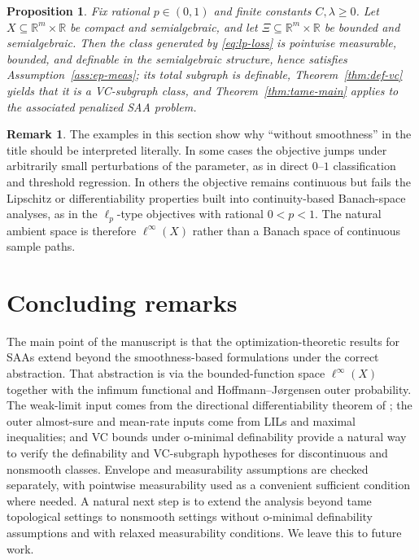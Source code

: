 \documentclass[11pt]{article}
\newtheorem{proposition}[theorem]{Proposition}\newtheorem{lemma}[theorem]{Lemma}\newtheorem{corollary}[theorem]{Corollary}\newtheorem{assumption}{Assumption}[section]\theoremstyle{definition}
\newtheorem{remark}[theorem]{Remark}
\begin{document}
\begin{proposition}\label{prop:lp} Fix rational $p\in(0,1)$ and finite
constants $C,\lambda\ge0$. Let $X\subseteq\mathbb{R}^{m}\times\mathbb{R}$
be compact and semialgebraic, and let $\Xi\subseteq\mathbb{R}^{m}\times\mathbb{R}$
be bounded and semialgebraic. Then the class generated by \eqref{eq:lp-loss} is
pointwise measurable, bounded, and definable in the semialgebraic
structure, hence satisfies Assumption~\ref{ass:ep-meas}; its total subgraph is definable,
Theorem~\ref{thm:def-vc} yields that it is a VC-subgraph class, and
Theorem~\ref{thm:tame-main} applies to the associated penalized SAA
problem.\end{proposition}

\begin{remark} The examples in this section show why ``without smoothness''
in the title should be interpreted literally. In some cases the objective
jumps under arbitrarily small perturbations of the parameter, as in
direct $0$--$1$ classification and threshold regression. In others
the objective remains continuous but fails the Lipschitz or differentiability
properties built into continuity-based Banach-space analyses, as in
the $\ell_{p}$-type objectives with rational $0<p<1$. The natural
ambient space is therefore $\ell^{\infty}(X)$ rather than a Banach
space of continuous sample paths. \end{remark}

\section{Concluding remarks}

\label{sec:conclusion}

The main point of the manuscript is that the optimization-theoretic
results for SAAs extend beyond the smoothness-based formulations under
the correct abstraction. That abstraction is via the bounded-function
space $\ell^{\infty}(X)$ together with the infimum functional and
Hoffmann--Jørgensen outer probability. The weak-limit input comes
from the directional differentiability theorem of \citet{Westerhout2024};
the outer almost-sure and mean-rate inputs come from LILs and maximal inequalities;
and VC bounds under o-minimal definability provide a natural way to
verify the definability and VC-subgraph hypotheses for discontinuous
and nonsmooth classes. Envelope and measurability assumptions are
checked separately, with pointwise measurability used as a convenient
sufficient condition where needed.
A natural next step is to extend
the analysis beyond tame topological settings to nonsmooth settings without o-minimal definability assumptions and with relaxed measurability conditions.
We leave this to future work.
\end{document}
